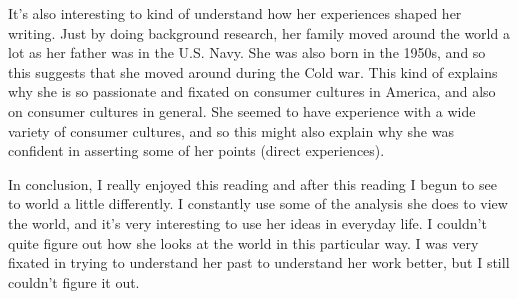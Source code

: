 \documentclass[11pt, oneside]{article}
\begin{document}
\par It's also interesting to kind of understand how her experiences shaped her writing. Just by doing background research, her family moved around the world a lot as her father was in the U.S. Navy. She was also born in the 1950s, and so this suggests that she moved around during the Cold war. This kind of explains why she is so passionate and fixated on consumer cultures in America, and also on consumer cultures in general. She seemed to have experience with a wide variety of consumer cultures, and so this might also explain why she was confident in asserting some of her points (direct experiences). 

\par In conclusion, I really enjoyed this reading and after this reading I begun to see to world a little differently. I constantly use some of the analysis she does to view the world, and it's very interesting to use her ideas in everyday life. I couldn't quite figure out how she looks at the world in this particular way. I was very fixated in trying to understand her past to understand her work better, but I still couldn't figure it out.
\end{document}
